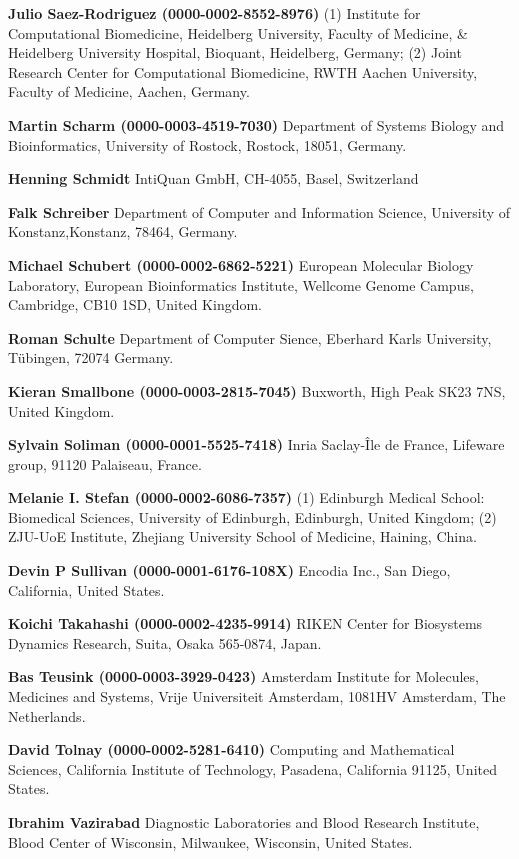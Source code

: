 \documentclass{sbml-paper}
\begin{document}
\textbf{Julio Saez-Rodriguez (0000-0002-8552-8976)} (1) Institute for Computational Biomedicine, Heidelberg University, Faculty of Medicine, & Heidelberg University Hospital, Bioquant, Heidelberg, Germany; (2) Joint Research Center for Computational Biomedicine, RWTH Aachen University, Faculty of Medicine, Aachen, Germany.

\textbf{Martin Scharm (0000-0003-4519-7030)} Department of Systems Biology and Bioinformatics, University of Rostock, Rostock, 18051, Germany.

\textbf{Henning Schmidt} IntiQuan GmbH, CH-4055, Basel, Switzerland

\textbf{Falk Schreiber} Department of Computer and Information Science, University of Konstanz,Konstanz, 78464, Germany.

\textbf{Michael Schubert (0000-0002-6862-5221)} European Molecular Biology Laboratory, European Bioinformatics Institute, Wellcome Genome Campus, Cambridge, CB10 1SD, United Kingdom.

\textbf{Roman Schulte} Department of Computer Sience, Eberhard Karls University, Tübingen, 72074 Germany.

\textbf{Kieran Smallbone (0000-0003-2815-7045)} Buxworth, High Peak SK23 7NS, United Kingdom.

\textbf{Sylvain Soliman (0000-0001-5525-7418)} Inria Saclay-Île de France, Lifeware group, 91120 Palaiseau, France.

\textbf{Melanie I. Stefan (0000-0002-6086-7357)} (1) Edinburgh Medical School: Biomedical Sciences, University of Edinburgh, Edinburgh, United Kingdom; (2) ZJU-UoE Institute, Zhejiang University School of Medicine, Haining, China.

\textbf{Devin P Sullivan (0000-0001-6176-108X)} Encodia Inc., San Diego, California, United States.

\textbf{Koichi Takahashi (0000-0002-4235-9914)} RIKEN Center for Biosystems Dynamics Research, Suita, Osaka 565-0874, Japan.

\textbf{Bas Teusink (0000-0003-3929-0423)} Amsterdam Institute for Molecules, Medicines and Systems, Vrije Universiteit Amsterdam, 1081HV Amsterdam, The Netherlands.

\textbf{David Tolnay (0000-0002-5281-6410)} Computing and Mathematical Sciences, California Institute of Technology, Pasadena, California 91125, United States.

\textbf{Ibrahim Vazirabad} Diagnostic Laboratories and Blood Research Institute, Blood Center of Wisconsin, Milwaukee, Wisconsin, United States.
\end{document}
